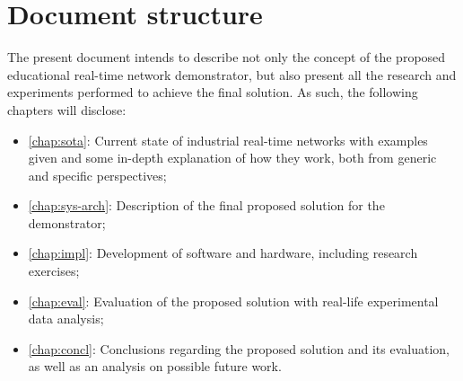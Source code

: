 \section{Document structure} \label{sec:doc-struct}

The present document intends to describe not only the concept of the proposed educational real-time network demonstrator, but also present all the research and experiments performed to achieve the final solution. As such, the following chapters will disclose:

\begin{itemize}
	\item \autoref{chap:sota}: Current state of industrial real-time networks with examples given and some in-depth explanation of how they work, both from generic and specific perspectives;

	\item \autoref{chap:sys-arch}: Description of the final proposed solution for the demonstrator;

	\item \autoref{chap:impl}: Development of software and hardware, including research exercises;

	\item \autoref{chap:eval}: Evaluation of the proposed solution with real-life experimental data analysis;

	\item \autoref{chap:concl}: Conclusions regarding the proposed solution and its evaluation, as well as an analysis on possible future work.
\end{itemize}
